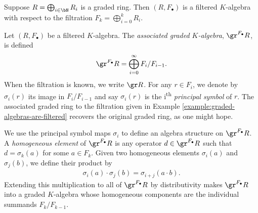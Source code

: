 \begin{example}\label{example:graded-algebras-are-filtered}
	Suppose $R = \bigoplus_{i \in \bN} R_i$ is a graded ring. Then $(R,F_\bullet)$ is a filtered $K$-algebra with respect to the filtration $F_k = \bigoplus_{i=0}^k R_i$. 	
\end{example}
\begin{defn}\label{defn:assoc-graded}
	Let $(R, F_\bullet)$ be a filtered $K$-algebra. The \emph{associated graded $K$-algebra}, $\gr^{F_\bullet} R$, is defined
	\begin{align*}
		\gr^{F_\bullet} R = \bigoplus^{\infty}_{i=0} F_i/F_{i-1}.
	\end{align*}
	When the filtration is known, we write $\gr R$. For any $r \in F_i$, we denote by $\sigma_i(r)$ its image in $F_i/F_{i-1}$ and say $\sigma_i(r)$ is the i\textsuperscript{th} \emph{principal symbol} of $r$. The associated graded ring to the filtration given in Example \ref{example:graded-algebras-are-filtered} recovers the original graded ring, as one might hope.
\end{defn}
We use the principal symbol maps $\sigma_i$ to define an algebra structure on $\gr^{F_\bullet} R$. A \emph{homogeneous element} of $\gr^{F_\bullet}R$ is any operator $d \in \gr^{F_\bullet} R$ such that $d = \sigma_k(a)$ for some $a \in F_k$. Given two homogeneous elements $\sigma_i(a)$ and $\sigma_j(b)$, we define their product by
\begin{align*}
	\sigma_i(a)\cdot \sigma_j(b) = \sigma_{i+j}(a\cdot b).
\end{align*}
Extending this multiplication to all of $\gr^{F_\bullet} R$ by distributivity makes $\gr^{F_\bullet} R$ into a graded $K$-algebra whose homogeneous components are the individual summands $F_k/F_{k-1}$.

\begin{comment}
\begin{rmk}\label{rmk:two-filtrations-yield-same-assoc-graded}
	Given that the notation $\gr A$ makes no reference to the choice of filtration, one would hope that $\gr A$ is independent of the specific filtration chosen, and indeed it is. 
\end{rmk}
\end{comment}


